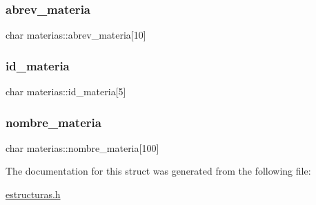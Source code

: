 \subsubsection{\texorpdfstring{abrev\+\_\+materia}{abrev\_materia}}
{\footnotesize\ttfamily char materias\+::abrev\+\_\+materia\mbox{[}10\mbox{]}}

\mbox{\label{structmaterias_ae285579bc06c3da15f087e1c1b829068}} 
\subsubsection{\texorpdfstring{id\+\_\+materia}{id\_materia}}
{\footnotesize\ttfamily char materias\+::id\+\_\+materia\mbox{[}5\mbox{]}}

\mbox{\label{structmaterias_a5d39a4c56dcd41b1cdc9873c5873400e}} 
\subsubsection{\texorpdfstring{nombre\+\_\+materia}{nombre\_materia}}
{\footnotesize\ttfamily char materias\+::nombre\+\_\+materia\mbox{[}100\mbox{]}}



The documentation for this struct was generated from the following file\+:\begin{DoxyCompactItemize}
\item 
\mbox{\hyperlink{estructuras_8h}{estructuras.\+h}}\end{DoxyCompactItemize}
